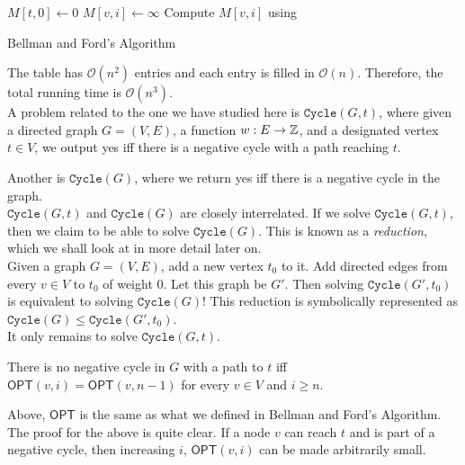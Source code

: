 \begin{algorithm}[H]
	\DontPrintSemicolon
	 {
		$M[t,0]\gets 0$\;
		 {
			$M[v,i]\gets\infty$
		}
		 {
			 {
				Compute $M[v,i]$ using \;
			}
		}
	}
	\caption{Bellman and Ford's Algorithm}\label{algo: bellman and ford}
\end{algorithm}

The table has $\mathcal{O}(n^2)$ entries and each entry is filled in $\mathcal{O}(n)$. Therefore, the total running time is $\mathcal{O}(n^3)$.\\

A problem related to the one we have studied here is $\texttt{Cycle}(G,t)$, where given a directed graph $G=(V,E)$, a function $w:E\to\mathbb{Z}$, and a designated vertex $t\in V$, we output yes iff there is a negative cycle with a path reaching $t$.

Another is $\texttt{Cycle}(G)$, where we return yes iff there is a negative cycle in the graph.\\

$\texttt{Cycle}(G,t)$ and $\texttt{Cycle}(G)$ are closely interrelated. If we solve $\texttt{Cycle}(G,t)$, then we claim to be able to solve $\texttt{Cycle}(G)$. This is known as a \textit{reduction}, which we shall look at in more detail later on.\\
Given a graph $G=(V,E)$, add a new vertex $t_0$ to it. Add directed edges from every $v\in V$ to $t_0$ of weight $0$. Let this graph be $G'$. Then solving $\texttt{Cycle}(G',t_0)$ is equivalent to solving $\texttt{Cycle}(G)$! This reduction is symbolically represented as $\texttt{Cycle}(G)\leq \texttt{Cycle}(G',t_0)$.\\
It only remains to solve $\texttt{Cycle}(G,t)$.

\begin{lemma*}
	There is no negative cycle in $G$ with a path to $t$ iff $\mathsf{OPT}(v,i)=\mathsf{OPT}(v,n-1)$ for every $v\in V$ and $i\geq n$.
\end{lemma*}
Above, $\mathsf{OPT}$ is the same as what we defined in Bellman and Ford's Algorithm. The proof for the above is quite clear. If a node $v$ can reach $t$ and is part of a negative cycle, then increasing $i$, $\mathsf{OPT}(v,i)$ can be made arbitrarily small.

